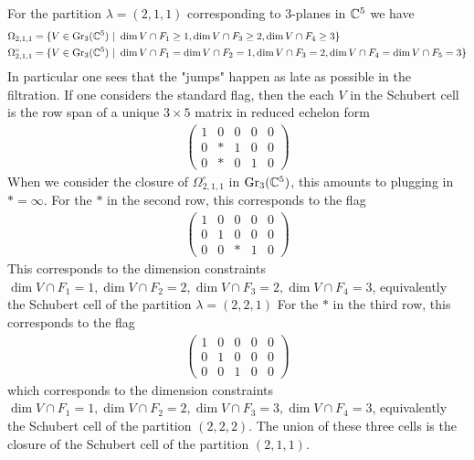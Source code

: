 \documentclass[12pt]{article}
\begin{document}
\begin{example}
	For the partition $\lambda = (2,1,1)$ corresponding to $3$-planes in $\mathbb{C}^5$ we have \begin{align*}
		\Omega_{2,1,1}       & = \{V\in \operatorname{Gr}_3(\mathbb{C}^5)\ \vert \  \dim V\cap F_1 \geq 1, \dim V\cap F_3 \geq 2, \dim V\cap F_4 \geq 3\}                           \\
		\Omega_{2,1,1}^\circ & = \{V \in \operatorname{Gr}_3(\mathbb{C}^5)\ \vert \  \dim V\cap F_1 = \dim V\cap F_2 = 1, \dim V\cap F_3 = 2, \dim V\cap F_4 = \dim V\cap F_5 = 3\}
	\end{align*}
	In particular one sees that the "jumps" happen as late as possible in the filtration. If one considers the standard flag,
	then the each $V$ in the Schubert cell is the row span of a unique $3\times 5$ matrix in reduced echelon form \begin{align*}
		\begin{pmatrix}
			1 & 0 & 0 & 0 & 0 \\
			0 & * & 1 & 0 & 0 \\
			0 & * & 0 & 1 & 0
		\end{pmatrix}
	\end{align*} When we consider the closure of $\Omega_{2,1,1}^\circ$ in $\operatorname{Gr}_3(\mathbb{C}^5)$, this amounts to plugging in $* = \infty$.
	For the $*$ in the second row, this corresponds to the flag \begin{align*}
		\begin{pmatrix}
			1 & 0 & 0 & 0 & 0 \\
			0 & 1 & 0 & 0 & 0 \\
			0 & 0 & * & 1 & 0
		\end{pmatrix}
	\end{align*} This corresponds to the dimension constraints $\dim V\cap F_1 = 1, \dim V\cap F_2 = 2, \dim V\cap F_3 = 2, \dim V\cap F_4 = 3$,
	equivalently the Schubert cell of the partition $\lambda = (2,2,1)$
	For the $*$ in the third row, this corresponds to the flag \begin{align*}
		\begin{pmatrix}
			1 & 0 & 0 & 0 & 0 \\
			0 & 1 & 0 & 0 & 0 \\
			0 & 0 & 1 & 0 & 0
		\end{pmatrix}
	\end{align*} which corresponds to the dimension constraints $\dim V\cap F_1 = 1, \dim V\cap F_2 = 2, \dim V\cap F_3 = 3, \dim V\cap F_4 = 3$,
	equivalently the Schubert cell of the partition $(2,2,2)$.
	The union of these three cells is the closure of the Schubert cell of the partition $(2,1,1)$.
\end{example}
\end{document}
